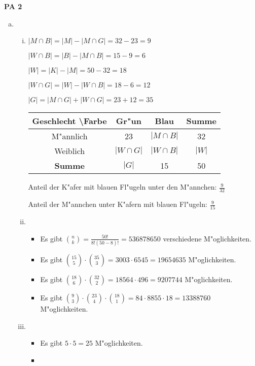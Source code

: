 \documentclass[a4paper,12pt]{article}
\newcommand{\PAufgabe}[1]{
        {
        \vspace*{0.5cm}
        \textbf{PA #1}
        \vspace*{0.2cm}
    }
}
\begin{document}
    \PAufgabe{2}
    \begin{enumerate}[(a)]
        \item 
        
        \begin{enumerate}[i.]
        \item

        $ |M \cap B| = |M| - |M \cap G| = 32 - 23 = 9 $

        $ |W \cap B| = |B| - |M \cap B| = 15 - 9 = 6 $

        $ |W| = |K| - |M| = 50 - 32 = 18 $

        $ |W \cap G| = |W| - |W \cap B| = 18 - 6 = 12 $

        $ |G| = |M \cap G| + |W \cap G| = 23 + 12 = 35 $

        \bigskip

        \begin{tabular}{|c|c|c|c|}
            \hline
            Geschlecht \textbackslash Farbe & Gr"un & Blau & \textbf{Summe} \\
            \hline
            M"annlich & 23 & $ |M \cap B| $ & 32 \\
            Weiblich & $ |W \cap G| $ & $ |W \cap B| $ & $ |W| $ \\
            \hline
            \textbf{Summe} & $ |G| $ & 15 & 50 \\
            \hline
        \end{tabular}

        \bigskip

        Anteil der K"afer mit blauen Fl"ugeln unter den M"annchen: $ \displaystyle\frac{9}{32} $

        Anteil der M"annchen unter K"afern mit blauen Fl"ugeln: $ \displaystyle \frac{9}{15} $

        \item

        \begin{itemize}
            \item Es gibt $ \displaystyle \binom{n}{k} = \frac{50!}{8!(50 - 8)!} = 536878650 $ verschiedene M"oglichkeiten.
            \item Es gibt $ \displaystyle \binom{15}{5} \cdot \binom{35}{3} = 3003 \cdot 6545 = 19654635 $ M"oglichkeiten.
            \item Es gibt $ \displaystyle \binom{18}{6} \cdot \binom{32}{2} = 18564 \cdot 496  = 9207744 $ M"oglichkeiten.
            \item Es gibt $ \displaystyle \binom{9}{3} \cdot \binom{23}{4} \cdot \binom{18}{1} = 84 \cdot 8855 \cdot 18 = 13388760 $ M"oglichkeiten.
        \end{itemize}

        \item

        \begin{itemize}
            \item Es gibt $ 5 \cdot 5 = 25 $ M"oglichkeiten.
            \item  
        \end{itemize}
    \end{enumerate}
    \end{enumerate}
\end{document}
